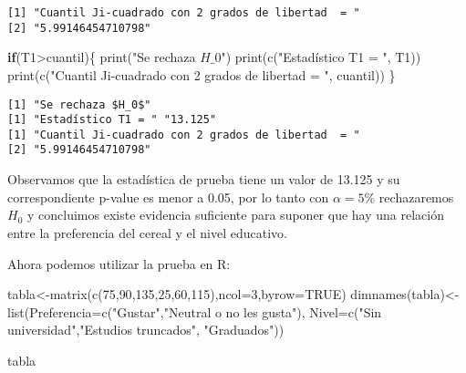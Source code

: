 \documentclass[
  a4paper,
  oneside,
  openany]{book}
\newenvironment{Shaded}{\begin{snugshade}}{\end{snugshade}}
\newcommand{\AttributeTok}[1]{\textcolor[rgb]{0.77,0.63,0.00}{#1}}
\newcommand{\ConstantTok}[1]{\textcolor[rgb]{0.00,0.00,0.00}{#1}}
\newcommand{\ControlFlowTok}[1]{\textcolor[rgb]{0.13,0.29,0.53}{\textbf{#1}}}
\newcommand{\DecValTok}[1]{\textcolor[rgb]{0.00,0.00,0.81}{#1}}
\newcommand{\FunctionTok}[1]{\textcolor[rgb]{0.00,0.00,0.00}{#1}}
\newcommand{\NormalTok}[1]{#1}
\newcommand{\OtherTok}[1]{\textcolor[rgb]{0.56,0.35,0.01}{#1}}
\newcommand{\SpecialCharTok}[1]{\textcolor[rgb]{0.00,0.00,0.00}{#1}}
\newcommand{\StringTok}[1]{\textcolor[rgb]{0.31,0.60,0.02}{#1}}
\begin{document}
\begin{verbatim}
[1] "Cuantil Ji-cuadrado con 2 grados de libertad  = "
[2] "5.99146454710798"                                
\end{verbatim}

\begin{Shaded}
\begin{Highlighting}[]
\ControlFlowTok{if}\NormalTok{(T1}\SpecialCharTok{\textgreater{}}\NormalTok{cuantil)\{}
  \FunctionTok{print}\NormalTok{(}\StringTok{"Se rechaza $H\_0$"}\NormalTok{)}
  \FunctionTok{print}\NormalTok{(}\FunctionTok{c}\NormalTok{(}\StringTok{"Estadístico T1 = "}\NormalTok{, T1))}
  \FunctionTok{print}\NormalTok{(}\FunctionTok{c}\NormalTok{(}\StringTok{"Cuantil Ji{-}cuadrado con 2 grados de libertad  = "}\NormalTok{, cuantil))}
\NormalTok{\}}
\end{Highlighting}
\end{Shaded}

\begin{verbatim}
[1] "Se rechaza $H_0$"
[1] "Estadístico T1 = " "13.125"           
[1] "Cuantil Ji-cuadrado con 2 grados de libertad  = "
[2] "5.99146454710798"                                
\end{verbatim}

Observamos que la estadística de prueba tiene un valor de 13.125 y su correspondiente p-value es menor a 0.05, por lo tanto con \(\alpha=5\%\) rechazaremos \(H_0\) y concluimos existe evidencia suficiente para suponer que hay una relación entre la preferencia del cereal y el nivel
educativo.

Ahora podemos utilizar la prueba en R:

\begin{Shaded}
\begin{Highlighting}[]
\NormalTok{tabla}\OtherTok{\textless{}{-}}\FunctionTok{matrix}\NormalTok{(}\FunctionTok{c}\NormalTok{(}\DecValTok{75}\NormalTok{,}\DecValTok{90}\NormalTok{,}\DecValTok{135}\NormalTok{,}\DecValTok{25}\NormalTok{,}\DecValTok{60}\NormalTok{,}\DecValTok{115}\NormalTok{),}\AttributeTok{ncol=}\DecValTok{3}\NormalTok{,}\AttributeTok{byrow=}\ConstantTok{TRUE}\NormalTok{)}
\FunctionTok{dimnames}\NormalTok{(tabla)}\OtherTok{\textless{}{-}} \FunctionTok{list}\NormalTok{(}\AttributeTok{Preferencia=}\FunctionTok{c}\NormalTok{(}\StringTok{"Gustar"}\NormalTok{,}\StringTok{"Neutral o no les gusta"}\NormalTok{), }\AttributeTok{Nivel=}\FunctionTok{c}\NormalTok{(}\StringTok{"Sin universidad"}\NormalTok{,}\StringTok{"Estudios truncados"}\NormalTok{,}
                      \StringTok{"Graduados"}\NormalTok{))}


\NormalTok{tabla}
\end{Highlighting}
\end{Shaded}
\end{document}
